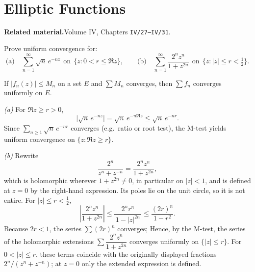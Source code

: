 \section{Elliptic Functions}

\par\medskip\noindent\textbf{Related material.}\quad Volume IV, Chapters \texttt{IV/27--IV/31}.

\begin{problem}[CP-IV-0020]
\label{prob:cp-iv-0020}
Prove uniform convergence for:
\[
\text{(a)}\quad \sum_{n=1}^\infty \sqrt{n}\,e^{-nz}\ \ \text{on}\ \ \{z: 0<r\le \Re z\},
\qquad
\text{(b)}\quad \sum_{n=1}^\infty \frac{2^n z^n}{1+z^{2n}}\ \ \text{on}\ \ \{z: |z|\le r<\tfrac12\}.
\]

If $|f_n(z)|\le M_n$ on a set $E$ and $\sum M_n$ converges, then $\sum f_n$ converges uniformly on $E$.
\end{problem}

\begin{solution}
\emph{(a)} For $\Re z\ge r>0$,
\[
\bigl|\sqrt{n}\,e^{-nz}\bigr|=\sqrt{n}\,e^{-n\Re z}\le \sqrt{n}\,e^{-nr}.
\]
Since $\sum_{n\ge1}\sqrt{n}\,e^{-nr}$ converges (e.g.\ ratio or root test), the M-test yields uniform convergence on $\{z:\Re z\ge r\}$.

\medskip
\emph{(b)} Rewrite
\[
\frac{2^n}{z^n+z^{-n}}=\frac{2^n z^n}{1+z^{2n}},
\]
which is holomorphic wherever $1+z^{2n}\ne0$, in particular on $|z|<1$, and is defined at $z=0$ by the right-hand expression. Its poles lie on the unit circle, so it is not entire. For $|z|\le r<\tfrac12$,
\[
\left|\frac{2^n z^n}{1+z^{2n}}\right|
\le \frac{2^n r^n}{\,1-|z|^{2n}\,}
\le \frac{(2r)^n}{1-r^2}.
\]
Because $2r<1$, the series $\sum (2r)^n$ converges; Hence, by the M-test, the series of the holomorphic extensions
$\sum \dfrac{2^n z^n}{1+z^{2n}}$ converges uniformly on $\{|z|\le r\}$.
For $0<|z|\le r$, these terms coincide with the originally displayed fractions
$2^n/(z^n+z^{-n})$; at $z=0$ only the extended expression is defined.

\clearpage
\end{solution}

